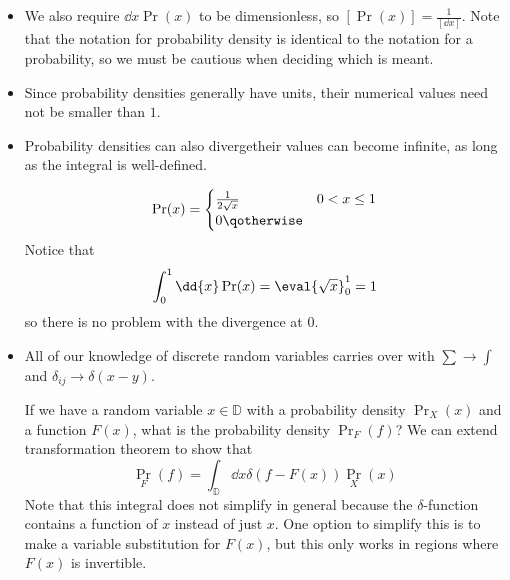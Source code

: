 \documentclass[a4paper,twoside,master.tex]{subfiles}
\begin{document}
\begin{itemize}
    \item We also require $ \dd{x} \Pr(x) $ to be dimensionless, so $ \left[ \Pr(x) \right] = \frac{1}{\left[ \dd{x} \right]} $. Note that the notation for probability density is identical to the notation for a probability, so we must be cautious when deciding which is meant.
    \item Since probability densities generally have units, their numerical values need not be smaller than $ 1 $.
    \item Probability densities can also diverge\textemdash their values can become infinite, as long as the integral is well-defined.
        \begin{ex}
            \begin{equation}
                \Pr(x) = \begin{cases} \frac{1}{2 \sqrt{x}} & 0 < x \leq 1 \\ 0 \qotherwise \end{cases}
            \end{equation}
            Notice that
            \begin{equation}
                \int_0^1 \dd{x} \Pr(x) = \eval{\sqrt{x}}_0^1 = 1
            \end{equation}
            so there is no problem with the divergence at $ 0 $.
        \end{ex}
    \item All of our knowledge of discrete random variables carries over with $ \sum \to \int $ and $ \delta_{ij} \to \delta(x-y) $.
        \begin{ex}
            If we have a random variable $ x \in \mathbb{D} $ with a probability density $ \Pr_{X}(x) $ and a function $ F(x) $, what is the probability density $ \Pr_{F}(f) $? We can extend transformation theorem to show that
            \begin{equation}\label{eq:transformation_prob_density}
                \Pr_{F}(f) = \int_{\mathbb{D}} \dd{x} \delta(f-F(x)) \Pr_{X}(x)\tag{Transformation Theorem for Probability Densities}
            \end{equation}
            Note that this integral does not simplify in general because the $\delta$-function contains a function of $ x $ instead of just $ x $. One option to simplify this is to make a variable substitution for $ F(x) $, but this only works in regions where $ F(x) $ is invertible.
        \end{ex}
\end{itemize}
\end{document}
